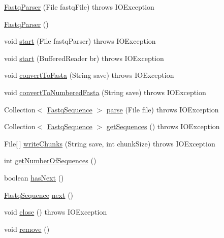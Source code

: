 \begin{DoxyCompactItemize}
\item 
\hyperlink{classbroad_1_1pda_1_1seq_1_1fastq_1_1_fastq_parser_a77a045bf908924dbb09af31bf3873493}{Fastq\+Parser} (File fastq\+File)  throws I\+O\+Exception
\item 
\hyperlink{classbroad_1_1pda_1_1seq_1_1fastq_1_1_fastq_parser_ab28b29c6d7217c8e9b35be1fabbe24d2}{Fastq\+Parser} ()
\item 
void \hyperlink{classbroad_1_1pda_1_1seq_1_1fastq_1_1_fastq_parser_ad6fee49ea1cb22e8ab2c9a5bfc5cbe7a}{start} (File fastq\+Parser)  throws I\+O\+Exception 
\item 
void \hyperlink{classbroad_1_1pda_1_1seq_1_1fastq_1_1_fastq_parser_a61e15412ca2ceb8d91767e7a1ed0de94}{start} (Buffered\+Reader br)  throws I\+O\+Exception 
\item 
void \hyperlink{classbroad_1_1pda_1_1seq_1_1fastq_1_1_fastq_parser_a954f65e71af98855f3477d5b17320f18}{convert\+To\+Fasta} (String save)  throws I\+O\+Exception
\item 
void \hyperlink{classbroad_1_1pda_1_1seq_1_1fastq_1_1_fastq_parser_a2bbe196edee4649d6a62c569426cad04}{convert\+To\+Numbered\+Fasta} (String save)  throws I\+O\+Exception
\item 
Collection$<$ \hyperlink{classbroad_1_1pda_1_1seq_1_1fastq_1_1_fastq_sequence}{Fastq\+Sequence} $>$ \hyperlink{classbroad_1_1pda_1_1seq_1_1fastq_1_1_fastq_parser_a292ca969701ba6a5ac79927f0c6bc33f}{parse} (File file)  throws I\+O\+Exception
\item 
Collection$<$ \hyperlink{classbroad_1_1pda_1_1seq_1_1fastq_1_1_fastq_sequence}{Fastq\+Sequence} $>$ \hyperlink{classbroad_1_1pda_1_1seq_1_1fastq_1_1_fastq_parser_ab6f48cad18b6a00b8be620714d07968b}{get\+Sequences} ()  throws I\+O\+Exception
\item 
File\mbox{[}$\,$\mbox{]} \hyperlink{classbroad_1_1pda_1_1seq_1_1fastq_1_1_fastq_parser_acffff1957b1c7233f497abbb3e1fd965}{write\+Chunks} (String save, int chunk\+Size)  throws I\+O\+Exception 
\item 
int \hyperlink{classbroad_1_1pda_1_1seq_1_1fastq_1_1_fastq_parser_a18db9a7a9677bdaa101504eb9654adc2}{get\+Number\+Of\+Sequences} ()
\item 
boolean \hyperlink{classbroad_1_1pda_1_1seq_1_1fastq_1_1_fastq_parser_a12a6925ce5f04e38305857c63e820968}{has\+Next} ()
\item 
\hyperlink{classbroad_1_1pda_1_1seq_1_1fastq_1_1_fastq_sequence}{Fastq\+Sequence} \hyperlink{classbroad_1_1pda_1_1seq_1_1fastq_1_1_fastq_parser_a90f65eeb25ce8009d7386ab410c1e95a}{next} ()
\item 
void \hyperlink{classbroad_1_1pda_1_1seq_1_1fastq_1_1_fastq_parser_a4dc28f7d389ce614c2f3bdcd2762f6b7}{close} ()  throws I\+O\+Exception
\item 
void \hyperlink{classbroad_1_1pda_1_1seq_1_1fastq_1_1_fastq_parser_a2a5b4f723340453275e7f6136ca2d0b4}{remove} ()
\end{DoxyCompactItemize}


